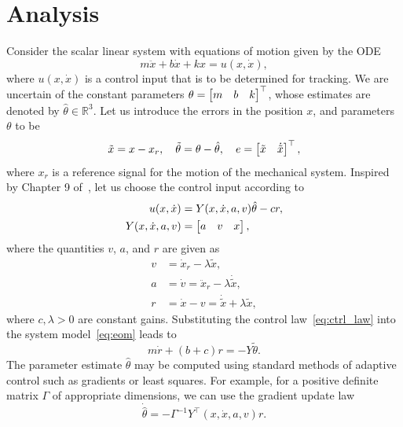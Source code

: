 \section{Analysis} 
\label{sec:analysis}

\noindent Consider the scalar linear system with equations of motion given by
the ODE
%
\begin{equation}
    m \ddot{x} + b\dot{x} + kx = u(x, \dot{x}),
    \label{eq:eom}
\end{equation}
%
where $u(x, \dot{x})$ is a control input that is to be determined for tracking.
We are uncertain of the constant parameters $\theta = \begin{bmatrix}m & b & k\end{bmatrix}^\top$,
whose estimates are denoted by $\hat{\theta} \in \mathbb{R}^3$. Let us introduce
the errors in the position $x$, and parameters $\theta$ to be \[ \tilde{x} = x -
x_r, \quad \tilde{\theta} = \theta - \hat{\theta}, \quad e = \begin{bmatrix}\tilde{x} &
\dot{\tilde{x}}\end{bmatrix}^\top, \] where $x_r$ is a reference
signal for the motion of the mechanical system. Inspired by Chapter 9
of~\cite{spong2020robot}, let us choose the control input according to 
\begin{align}
    \begin{split}
        u(x, \dot{x}) &= Y(x, \dot{x}, a, v)\hat{\theta} - cr, \\
        Y(x, \dot{x}, a, v) &= \begin{bmatrix}a & v & x\end{bmatrix},
    \end{split}
    \label{eq:ctrl_law}
\end{align}
%
where the quantities $v$, $a$, and $r$ are given as
\begin{align*}
    v &= \dot{x}_r - \lambda \tilde{x}, \\
    a &= \dot{v} = \ddot{x}_r - \lambda \dot{\tilde{x}}, \\
    r &= \dot{x} - v = \dot{\tilde{x}} + \lambda \tilde{x},
\end{align*}
%
where $c, \lambda > 0$ are constant gains. Substituting the control
law~\eqref{eq:ctrl_law} into the system model~\eqref{eq:eom} leads to
%
\begin{equation}
    m\dot{r} + (b+c)r = -Y\tilde{\theta}.
    \label{eq:control_applied}
\end{equation}
%
The parameter estimate $\hat{\theta}$ may be computed using standard methods of
adaptive control such as gradients or least squares. For example, for a positive
definite matrix $\Gamma$ of appropriate dimensions, we can use the gradient
update law
%
\begin{equation}
    \dot{\hat{\theta}} = -\Gamma^{-1}Y^\top(x, \dot{x}, a, v)r.
    \label{eq:param_update}
\end{equation}

